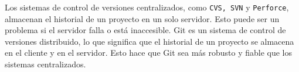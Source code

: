 
Los sistemas de control de versiones centralizados, como \texttt{CVS, SVN} y \texttt{Perforce},
almacenan el historial de un proyecto en un solo servidor. Esto puede ser un problema si el
servidor falla o está inaccesible. Git es un sistema de control de versiones distribuido, 
lo que significa que el historial de un proyecto se almacena en el cliente y en el servidor.
Esto hace que Git sea más robusto y fiable que los sistemas centralizados.

